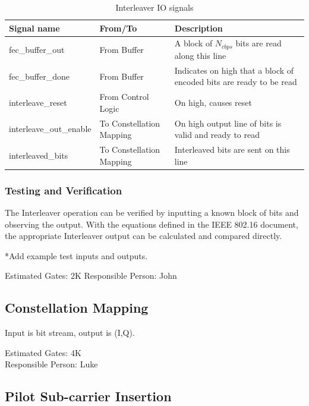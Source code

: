 \documentclass[dvips,10pt,twocolumn]{article}
\begin{document}
	\begin{table}
		\begin{tabularx}{\textwidth}{X|X|X|}
		\label{tbl:interleave}
			Signal name & From/To &
			Description \\ \hline
			fec\_buffer\_out & From Buffer & A block of $N_{cbps}$ bits are read
			along this line \\ \hline
			fec\_buffer\_done & From Buffer & Indicates on high that a block of
		 	encoded bits are ready to be read \\ \hline
			interleave\_reset & From Control Logic & On high, causes reset\\ \hline
			interleave\_out\_enable & To Constellation Mapping & On high output
			line of bits is valid and ready to read \\ \hline
			interleaved\_bits & To Constellation Mapping & Interleaved bits are
			sent on this line \\ \hline
		\end{tabularx}
		\caption{Interleaver IO signals}
	\end{table}
	
  \subsubsection{Testing and Verification}
  
  The Interleaver operation can be verified by inputting a known block of bits
  and observing the output. With the equations defined in the IEEE 802.16
  document, the appropriate Interleaver output can be calculated and compared
  directly. 
  
  *Add example test inputs and outputs. 

  Estimated Gates: 2K
  Responsible Person: John

	\subsection{Constellation Mapping}
	\label{sec:constellation}

	Input is bit stream, output is (I,Q).
	
	Estimated Gates: 4K \\
	Responsible Person: Luke

	\subsection{Pilot Sub-carrier Insertion}
	\label{sec:pilot}
\end{document}
